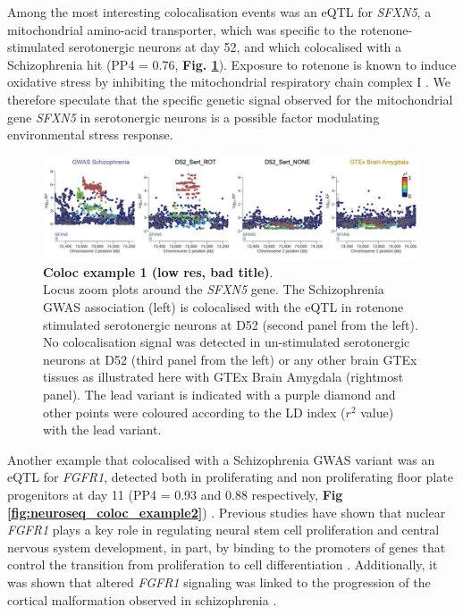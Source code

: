 \newpage

Among the most interesting colocalisation events was an eQTL for \textit{SFXN5}, a mitochondrial amino-acid transporter, which was specific to the rotenone-stimulated serotonergic neurons at day 52, and which colocalised with a Schizophrenia hit (PP4 = 0.76, \textbf{Fig. \ref{fig:neuroseq_coloc_example1}}). 
Exposure to rotenone is known to induce oxidative stress by inhibiting the mitochondrial respiratory chain complex I \cite{palmer1968studies, betarbet2000chronic}. 
We therefore speculate that the specific genetic signal observed for the mitochondrial gene \textit{SFXN5} in serotonergic neurons is a possible factor modulating environmental stress response.\\

\begin{figure}[h]
\centering
\includegraphics[width=16cm]{Chapter5/Fig/neuroseq_coloc_example1_SFXN5.png}
\caption[Coloc example 1]{\textbf{Coloc example 1 (low res, bad title)}.\\
Locus zoom plots around the \textit{SFXN5} gene. 
The Schizophrenia GWAS association (left) is colocalised with the eQTL in rotenone stimulated serotonergic neurons at D52 (second panel from the left). 
No colocalisation signal was detected in un-stimulated serotonergic neurons at D52 (third panel from the left) or any other brain GTEx tissues as illustrated here with GTEx Brain Amygdala (rightmost panel). 
The lead variant is indicated with a purple diamond and other points were coloured according to the LD index ($r^2$ value) with the lead variant.}
\label{fig:neuroseq_coloc_example1}
\end{figure}

Another example that colocalised with a Schizophrenia GWAS variant was an eQTL for
\textit{FGFR1}, detected both in proliferating and non proliferating floor plate progenitors at day 11 (PP4 = 0.93 and 0.88 respectively, \textbf{Fig \ref{fig:neuroseq_coloc_example2}}) . 
Previous studies have shown that nuclear \textit{FGFR1} plays a key role in regulating neural stem cell proliferation and central nervous system development, in part, by binding to the promoters of genes that control the transition from proliferation to cell differentiation \cite{ma2009molecular}. 
Additionally, it was shown that altered \textit{FGFR1} signaling was linked to the progression of the cortical malformation observed in schizophrenia \cite{stachowiak2017cerebral}.\\

